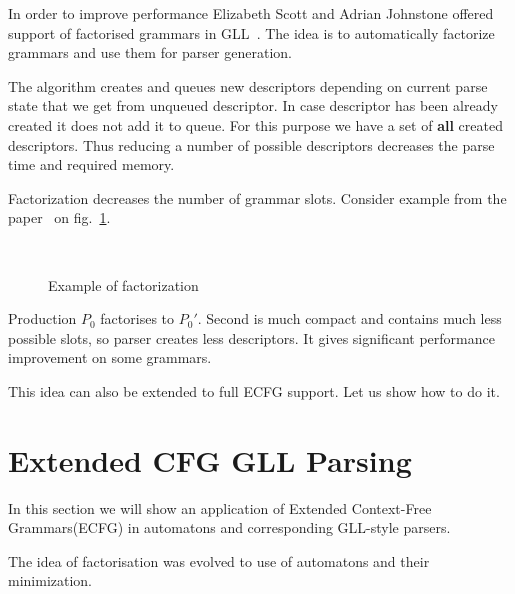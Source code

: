 \documentclass[runningheads,a4paper]{llncs}
\begin{document}
In order to improve performance Elizabeth Scott and Adrian Johnstone offered support of factorised grammars in GLL~\cite{scott2016structuring}. 
The idea is to automatically factorize grammars and use them for parser generation. 

The algorithm creates and queues new descriptors depending on current parse state that we get from unqueued descriptor. 
In case descriptor has been already created it does not add it to queue. For this purpose we have a set of
\textbf{all} created descriptors. Thus reducing a number of possible descriptors decreases the parse time
and required memory.

Factorization decreases the number of grammar slots. 
Consider example from the paper~\cite{scott2016structuring} on fig.~\ref{fig:ExampleOfFactorization}.

\begin{figure}
    \centering
    ~
    \caption{Example of factorization}
    \label{fig:ExampleOfFactorization}
\end{figure}
Production $P_0$ factorises to $P_0'$.
Second is much compact and contains much less possible slots, 
so parser creates less descriptors.
It gives significant performance improvement on some grammars.

This idea can also be extended to full ECFG support.
Let us show how to do it.


\section{Extended CFG GLL Parsing}%

In this section we will show an application of Extended Context-Free Grammars(ECFG) in automatons and corresponding GLL-style parsers.

The idea of factorisation was evolved to use of automatons and their minimization.
\end{document}
